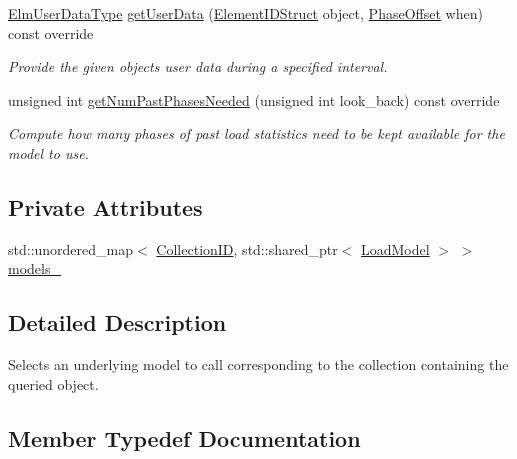 \begin{DoxyCompactItemize}
\hyperlink{namespacevt_1_1vrt_1_1collection_1_1balance_abf9eea0f4c24e41036ab844025e7d4c8}{Elm\+User\+Data\+Type} \hyperlink{structvt_1_1vrt_1_1collection_1_1balance_1_1_per_collection_ac58fae4d9e5480c1fc1844448f54b85a}{get\+User\+Data} (\hyperlink{namespacevt_1_1vrt_1_1collection_1_1balance_a9f5b53fafb270212279a4757d2c4cd28}{Element\+I\+D\+Struct} object, \hyperlink{structvt_1_1vrt_1_1collection_1_1balance_1_1_phase_offset}{Phase\+Offset} when) const override
\begin{DoxyCompactList}\small\item\em Provide the given object\textquotesingle{}s user data during a specified interval. \end{DoxyCompactList}\item 
unsigned int \hyperlink{structvt_1_1vrt_1_1collection_1_1balance_1_1_per_collection_ad71f5405a169c5fe2a25668df96c3a7c}{get\+Num\+Past\+Phases\+Needed} (unsigned int look\+\_\+back) const override
\begin{DoxyCompactList}\small\item\em Compute how many phases of past load statistics need to be kept available for the model to use. \end{DoxyCompactList}\end{DoxyCompactItemize}
\subsection*{Private Attributes}
\begin{DoxyCompactItemize}
\item 
std\+::unordered\+\_\+map$<$ \hyperlink{structvt_1_1vrt_1_1collection_1_1balance_1_1_per_collection_ade08a6857f727a0a9d1ef63b25fc5b71}{Collection\+ID}, std\+::shared\+\_\+ptr$<$ \hyperlink{structvt_1_1vrt_1_1collection_1_1balance_1_1_load_model}{Load\+Model} $>$ $>$ \hyperlink{structvt_1_1vrt_1_1collection_1_1balance_1_1_per_collection_aec76660b4a44fe451a9546b4f4c50d3d}{models\+\_\+}
\end{DoxyCompactItemize}


\subsection{Detailed Description}
Selects an underlying model to call corresponding to the collection containing the queried object. 

\subsection{Member Typedef Documentation}
\mbox{\label{structvt_1_1vrt_1_1collection_1_1balance_1_1_per_collection_ade08a6857f727a0a9d1ef63b25fc5b71}} 
